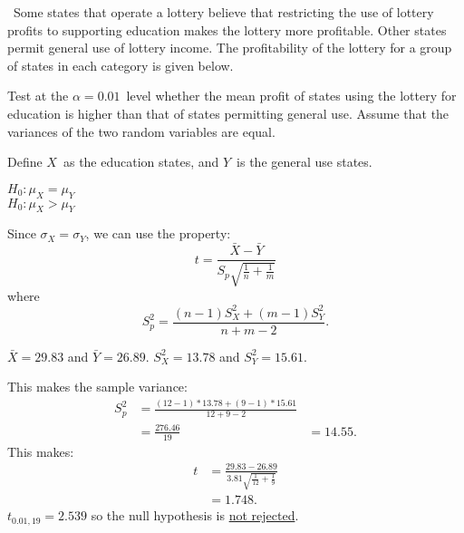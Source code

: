 \begin{problem}
  ~Some states that operate a lottery believe that restricting the use of lottery profits to supporting education makes the lottery more profitable. Other states permit general use of lottery income.  The profitability of the lottery for a group of states in each category is given below.

  Test at the ${\alpha = 0.01}$~level whether the mean profit of states using the lottery for education is higher than that of states permitting general use. Assume that the variances of the two random variables are equal.
\end{problem}

Define $X$~as the education states, and $Y$~is the general use states.

\noindent
${H_0: \mu_{X} = \mu_{Y}}$ \\
${H_0: \mu_{X} > \mu_{Y}}$

Since ${\sigma_{X} = \sigma_{Y}}$, we can use the property:
\begin{equation}
  t = \frac{\bar{X} - \bar{Y}}{S_{p} \sqrt{\frac{1}{n} + \frac{1}{m}}}
\end{equation}
\noindent
where
\begin{equation}
  S^{2}_{p} = \frac{(n-1)S^{2}_{X} + (m-1)S^{2}_{Y}}{n + m - 2}\text{.}
\end{equation}

${\bar{X} = 29.83}$ and ${\bar{Y} = 26.89}$. ${S^{2}_{X} = 13.78}$ and ${S^{2}_{Y} = 15.61}$.

This makes the sample variance:
\begin{align}
  S^{2}_{p} &= \frac{(12 - 1) * 13.78 + (9 - 1) * 15.61}{12 + 9 - 2} \\
            &= \frac{276.46}{19}
            &= 14.55 \text{.}
\end{align}
This makes:
\begin{align}
  t &=  \frac{29.83 - 26.89}{3.81 \sqrt{\frac{1}{12} + \frac{1}{9}}} \\
    &= 1.748\text{.}
\end{align}
\noindent
${t_{0.01,19} = 2.539}$ so the null hypothesis is \underline{not rejected}.
